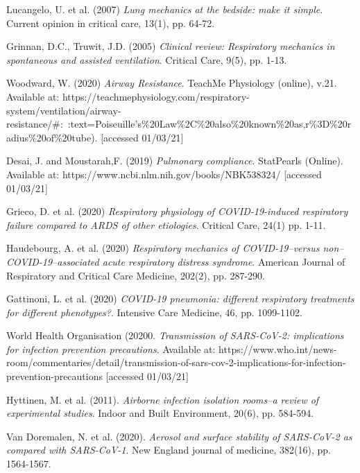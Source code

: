 \documentclass[11pt]{report}
\begin{document}
\begin{thebibliography}{1}
 
        Lucangelo, U. et al. (2007) \emph{Lung mechanics at the bedside: make it simple}. Current opinion in critical care, 13(1), pp. 64-72.

        Grinnan, D.C., Truwit, J.D. (2005) \emph{Clinical review: Respiratory mechanics in spontaneous and assisted ventilation}. Critical Care, 9(5), pp. 1-13.

        Woodward, W.  (2020) \emph{Airway Resistance}. TeachMe Physiology (online), v.21. Available at: https://teachmephysiology.com/respiratory-system/ventilation/airway-resistance/\#:~:text=Poiseuille's\%20Law\%2C\%20also\%20known\%20as,r\%3D\%20radius\%20of\%20tube). [accessed 01/03/21]

        Desai, J. and Moustarah,F. (2019) \emph{Pulmonary compliance}. StatPearls (Online). Available at: https://www.ncbi.nlm.nih.gov/books/NBK538324/ [accessed 01/03/21]

        Grieco, D. et al. (2020) \emph{Respiratory physiology of COVID-19-induced respiratory failure compared to ARDS of other etiologies}. Critical Care, 24(1) pp. 1-11.

        Haudebourg, A. et al. (2020) \emph{Respiratory mechanics of COVID-19–versus non–COVID-19–associated acute respiratory distress syndrome}. American Journal of Respiratory and Critical Care Medicine, 202(2), pp. 287-290.

        Gattinoni, L. et al. (2020) \emph{COVID-19 pneumonia: different respiratory treatments for different phenotypes?}. Intensive Care Medicine, 46, pp. 1099-1102.
 
 
        World Health Organisation (20200. \emph{Transmission of SARS-CoV-2: implications for infection prevention precautions}. Available at: https://www.who.int/news-room/commentaries/detail/transmission-of-sars-cov-2-implications-for-infection-prevention-precautions [accessed 01/03/21]

        Hyttinen, M. et al. (2011). \emph{Airborne infection isolation rooms–a review of experimental studies}. Indoor and Built Environment, 20(6), pp. 584-594.

        Van Doremalen, N. et al. (2020). \emph{Aerosol and surface stability of SARS-CoV-2 as compared with SARS-CoV-1}. New England journal of medicine, 382(16), pp. 1564-1567.


\end{thebibliography}
\end{document}

